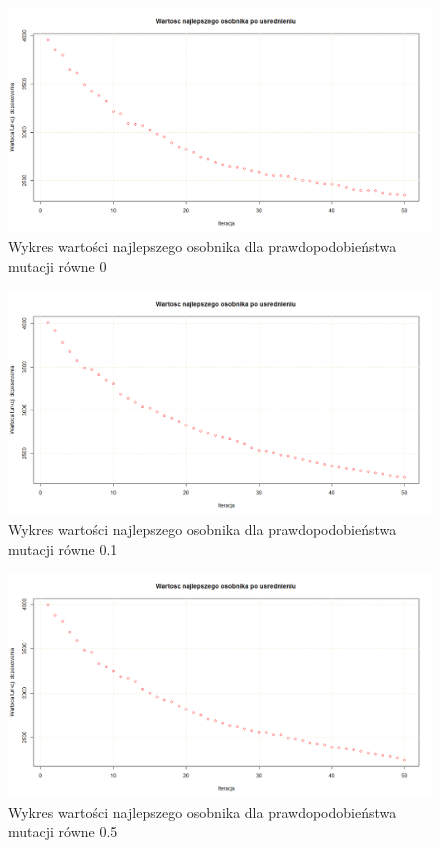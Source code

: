 \documentclass{article}
\begin{document}
\begin{figure}[H]
\centering

\includegraphics[scale=0.3]{IO_obrazy/bay29_mu_0}
\caption{Wykres wartości najlepszego osobnika dla prawdopodobieństwa mutacji równe 0}
\end{figure}

\begin{figure}[H]
\centering

\includegraphics[scale=0.3]{IO_obrazy/bay29_mu_01}
\caption{Wykres wartości najlepszego osobnika dla prawdopodobieństwa mutacji równe 0.1}
\end{figure}

\begin{figure}[H]
\centering

\includegraphics[scale=0.3]{IO_obrazy/bay29_mu_05}
\caption{Wykres wartości najlepszego osobnika dla prawdopodobieństwa mutacji równe 0.5}
\end{figure}
\end{document}
